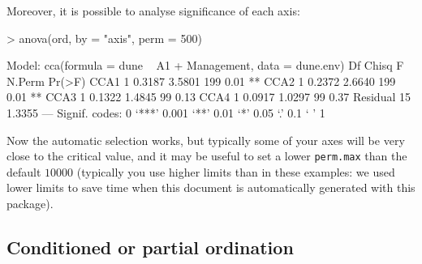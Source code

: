 \documentclass[a4paper,10pt]{amsart}
\begin{document}
Moreover, it is possible to analyse significance of each axis:
\begin{Schunk}
\begin{Sinput}
> anova(ord, by = "axis", perm = 500)
\end{Sinput}
\begin{Soutput}
Model: cca(formula = dune ~ A1 + Management, data = dune.env)
         Df  Chisq      F N.Perm Pr(>F)   
CCA1      1 0.3187 3.5801    199   0.01 **
CCA2      1 0.2372 2.6640    199   0.01 **
CCA3      1 0.1322 1.4845     99   0.13   
CCA4      1 0.0917 1.0297     99   0.37   
Residual 15 1.3355                        
---
Signif. codes:  0 ‘***’ 0.001 ‘**’ 0.01 ‘*’ 0.05 ‘.’ 0.1 ‘ ’ 1 
\end{Soutput}
\end{Schunk}
Now the automatic selection works, but typically some of your axes
will be very close to the critical value, and it may be useful to set
a lower \texttt{perm.max} than the default $10000$ (typically you use
higher limits than in these examples: we used lower limits to save
time when this document is automatically generated with this package).

\subsection{Conditioned or partial ordination}
\end{document}
